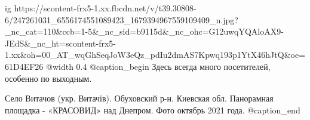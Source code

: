  
 
 
 
 

\ifcmt
  ig https://scontent-frx5-1.xx.fbcdn.net/v/t39.30808-6/247261031_6556174551089423_1679394967559109409_n.jpg?_nc_cat=110&ccb=1-5&_nc_sid=b9115d&_nc_ohc=G12uwqYQAloAX9-JEdS&_nc_ht=scontent-frx5-1.xx&oh=00_AT_wqGhSeqJoW3eQz_pdIu2dmAS7Kpwq193p1YtX46hJtQ&oe=61D4EF26
  @width 0.4
  @caption_begin
    Здесь всегда много посетителей, особенно по выходным.

    Село Витачов (укр. Витачів). Обуховский р-н. Киевская обл. 
    Панорамная площадка - «КРАСОВИД» над Днепром. Фото октябрь 2021 года.
  @caption_end
\fi
